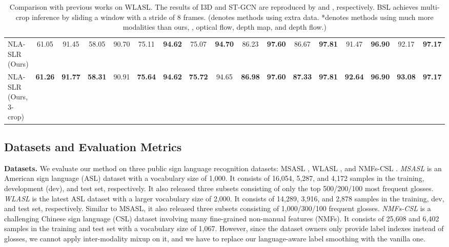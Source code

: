 \documentclass[10pt,twocolumn,letterpaper]{article}
\def \tbf{\textbf}
\begin{document}
\begin{table*}[t]
{\begin{tabular}{l|cc|cc|cc|cc|cc|cc|cc|cc}
NLA-SLR (Ours) & 61.05 & 91.45 & 58.05 & 90.70 & 75.11 & \tbf{94.62} & 75.07 & \tbf{94.70} & 86.23 & \tbf{97.60} & 86.67 & \tbf{97.81} & 91.47 & \tbf{96.90} & 92.17 & \tbf{97.17} \\
NLA-SLR (Ours, 3-crop) & \tbf{61.26} & \tbf{91.77} & \tbf{58.31} & 90.91 & \tbf{75.64} & \tbf{94.62} & \tbf{75.72} & 94.65 & \tbf{86.98} & \tbf{97.60} & \tbf{87.33} & \tbf{97.81} & \tbf{92.64} & \tbf{96.90} & \tbf{93.08} & \tbf{97.17} \\

\bottomrule
\end{tabular}}
\vspace{-3mm}
\caption{Comparison with previous works on WLASL. The results of I3D and ST-GCN are reproduced by \cite{li2020word} and \cite{hu2021signbert}, respectively. BSL achieves multi-crop inference by sliding a window with a stride of 8 frames. (denotes methods using extra data. *denotes methods using much more modalities than ours, \eg, optical flow, depth map, and depth flow.)}
\label{tab:sota_wlasl}
\vspace{-5mm}
\end{table*}


\subsection{Datasets and Evaluation Metrics}
\noindent\textbf{Datasets.}
We evaluate our method on three public sign language recognition datasets: MSASL \cite{joze2019ms}, WLASL \cite{li2020word}, and NMFs-CSL \cite{hu2021global}.
\textit{MSASL} is an American sign language (ASL) dataset with a vocabulary size of 1,000. It consists of 16,054, 5,287, and 4,172 samples in the training, development (dev), and test set, respectively. It also released three subsets consisting of only the top 500/200/100 most frequent glosses.
\textit{WLASL} is the latest ASL dataset with a larger vocabulary size of 2,000. It consists of 14,289, 3,916, and 2,878 samples in the training, dev, and test set, respectively. Similar to MSASL, it also released three subsets consisting of 1,000/300/100 frequent glosses.
\textit{NMFs-CSL} is a challenging Chinese sign language (CSL) dataset involving many fine-grained non-manual features (NMFs). It consists of 25,608 and 6,402 samples in the training and test set with a vocabulary size of 1,067. However, since the dataset owners only provide label indexes instead of glosses, we cannot apply inter-modality mixup on it, and we have to replace our language-aware label smoothing with the vanilla one.
\end{document}

